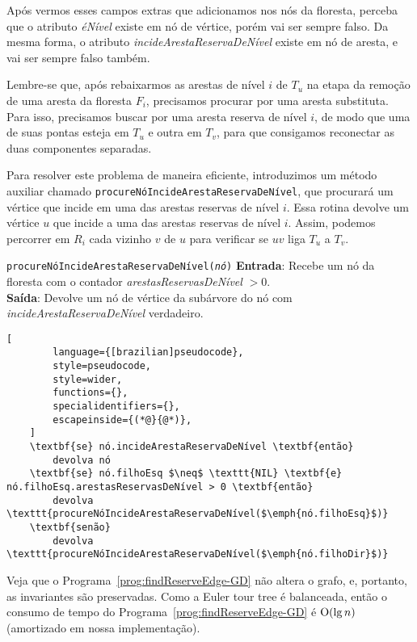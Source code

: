 \raggedbottom

Após vermos esses campos extras que adicionamos nos nós da floresta, perceba que o atributo \textit{éNível} existe em nó de vértice, porém vai ser sempre falso. Da mesma forma, o atributo \textit{incideArestaReservaDeNível} existe em nó de aresta, e vai ser sempre falso também. 

Lembre-se que, após rebaixarmos as arestas de nível $i$ de $T_u$ na etapa da remoção de uma aresta da floresta $F_i$, precisamos procurar por uma aresta substituta. Para isso, precisamos buscar por uma aresta reserva de nível $i$, de modo que uma de suas pontas esteja em $T_u$ e outra em $T_v$, para que consigamos reconectar as duas componentes separadas. 

Para resolver este problema de maneira eficiente, introduzimos um método auxiliar chamado \texttt{procureNóIncideArestaReservaDeNível}, que procurará um vértice que incide em uma das arestas reservas de nível $i$.
Essa rotina devolve um vértice $u$ que incide a uma das arestas reservas de nível $i$. Assim, podemos percorrer em $R_i$ cada vizinho $v$ de $u$ para verificar se $uv$ liga $T_u$ a $T_v$. 

\begin{programruledcaption}{\texttt{procureNóIncideArestaReservaDeNível(\textit{nó})} \label{prog:findReserveEdge-GD}}
    \noindent\textbf{Entrada}: Recebe um nó da floresta com o contador \textit{arestasReservasDeNível} $> 0$.
    \\
    \noindent\textbf{Saída}: Devolve um nó de vértice da subárvore do nó com \textit{incideArestaReservaDeNível} verdadeiro.
    \vspace{-0.5\baselineskip}
    \begin{lstlisting}[
        language={[brazilian]pseudocode},
        style=pseudocode,
        style=wider,
        functions={},
        specialidentifiers={},
        escapeinside={(*@}{@*)},
    ]
    \textbf{se} nó.incideArestaReservaDeNível \textbf{então}
        devolva nó
    \textbf{se} nó.filhoEsq $\neq$ \texttt{NIL} \textbf{e} nó.filhoEsq.arestasReservasDeNível > 0 \textbf{então}
        devolva \texttt{procureNóIncideArestaReservaDeNível($\emph{nó.filhoEsq}$)}
    \textbf{senão}
        devolva \texttt{procureNóIncideArestaReservaDeNível($\emph{nó.filhoDir}$)}
\end{lstlisting}
\vspace{-0.5\baselineskip}
\end{programruledcaption}

Veja que o Programa~\ref{prog:findReserveEdge-GD} não altera o grafo, e, portanto, as invariantes são preservadas. Como a Euler tour tree é balanceada, então o consumo de tempo do Programa~\ref{prog:findReserveEdge-GD} é $\mathrm{O}(\lg n)$ (amortizado em nossa implementação).

